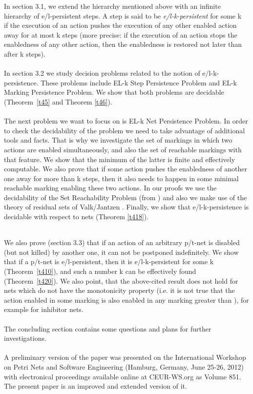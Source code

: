 \documentclass[a4paper]{llncs}
\begin{document}
In section 3.1, we extend the hierarchy mentioned above with an infinite hierarchy of e/l-persistent steps. A step  is said to be \emph{e/l-k-persistent} for some k~ if the execution of an action  pushes the execution of any other enabled action away for at most k steps (more precise: if the execution of an action  stops the enabledness of any other action, then the enabledness is restored not later than after k steps). 
\\ \\
In section 3.2 we study decision problems related to the notion of e/l-k-persistence. These problems include EL-k Step Persistence Problem and EL-k Marking Persistence Problem. We show that both problems are decidable (Theorem~\ref{t45} and Theorem \ref{t46}). 
\\ \\
The next problem we want to focus on is EL-k Net Persistence Problem. In order to check the decidability of the problem we need to take advantage of additional tools and facts.
That is why we investigate the set of markings in which two actions are enabled simultaneously, and also the set of reachable markings with that feature. We show that the minimum of the latter is finite and effectively computable. We also prove that if some action pushes the enabledness of another one away for more than k steps, then it also needs to happen in some minimal reachable marking enabling these two actions. In our proofs we use the decidability of the Set Reachability Problem (from \cite{BarOch}) and also we make use of the theory of residual sets of Valk/Jantzen \cite{ValkJantzen}. Finally, we show that e/l-k-persistence is decidable with respect to nets (Theorem \ref{t418}).


\mbox{ }\\
We also prove (section 3.3) that if an action of an arbitrary p/t-net is disabled (but not killed) by another one, it can not be postponed indefinitely. We show that if a p/t-net is e/l-persistent, then it is e/l-k-persistent for some k  (Theorem~\ref{t410}), and such a number k can be effectively found (Theorem~\ref{t420}). We also point, that the above-cited result does not hold for nets which do not have the monotonicity property (i.e. it is not true that the action enabled in some marking  is also enabled in any marking  greater than ), for example for inhibitor nets.
\\ \\
The concluding section contains some questions and plans for further investigations.
\\ \\
A preliminary version of the paper was presented on the International Workshop on Petri Nets and Software Engineering (Hamburg, Germany, June 25-26, 2012) with electronical proceedings available online at CEUR-WS.org as Volume 851. The present paper is an improved and extended version of it.
\end{document}
